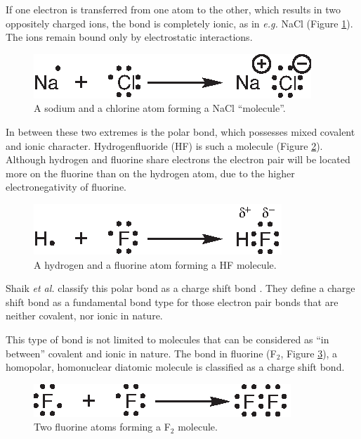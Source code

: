 If one electron is transferred from one atom to the other, which results in two oppositely charged ions, the bond is completely ionic, as in \textit{e.g.} NaCl (Figure \ref{ch3.fig.nacl}). The ions remain bound only by electrostatic interactions. 
\begin{figure}[ht]
\center
\includegraphics{dissociation/figures/nacl.eps}
\caption{A sodium and a chlorine atom forming a NaCl ``molecule''.}
\label{ch3.fig.nacl}
\end{figure}

In between these two extremes is the polar bond, which possesses mixed covalent and ionic character. Hydrogenfluoride (HF) is such a molecule (Figure \ref{ch3.fig.hf}). Although hydrogen and fluorine share electrons the electron pair will be located more on the fluorine than on the hydrogen atom, due to the higher electronegativity of fluorine.
\begin{figure}[ht]
\center
\includegraphics{dissociation/figures/hf.eps}
\caption{A hydrogen and a fluorine atom forming a HF molecule.}
\label{ch3.fig.hf}
\end{figure}
Shaik \textit{et al.} classify this polar bond as a charge shift bond \cite{cs1,cs2}. They define a charge shift bond as a fundamental bond type for those electron pair bonds that are neither covalent, nor ionic in nature. 

This type of bond is not limited to molecules that can be considered as ``in between'' covalent and ionic in nature. The bond in fluorine (F$_2$, Figure \ref{ch3.fig.f_twee}), a homopolar, homonuclear diatomic molecule is classified as a charge shift bond.
\begin{figure}[h]
\center
\includegraphics{dissociation/figures/f_twee.eps}
\caption{Two fluorine atoms forming a F$_2$ molecule.}
\label{ch3.fig.f_twee} 
\end{figure}

